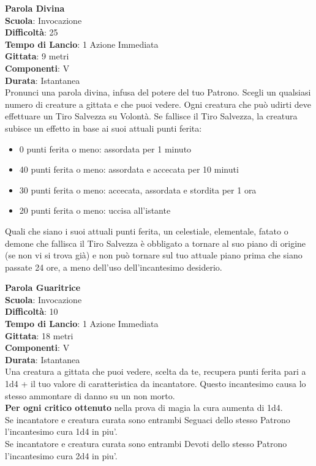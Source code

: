 \begin{multicols}{2}
\medskip\textbf{Parola Divina}\\
\textbf{Scuola}: Invocazione\\
\textbf{Difficoltà}: 25\\
\textbf{Tempo di Lancio}: 1 Azione Immediata\\
\textbf{Gittata}: 9 metri\\
\textbf{Componenti}: V\\
\textbf{Durata}: Istantanea\\
Pronunci una parola divina, infusa del potere del tuo Patrono. Scegli un qualsiasi numero di creature a gittata e che puoi vedere. Ogni creatura che può udirti deve effettuare un Tiro Salvezza su Volontà. Se fallisce il Tiro Salvezza, la creatura subisce un effetto in base ai suoi attuali punti ferita:
\medskip
\begin{itemize}
\item	
0 punti ferita o meno: assordata per 1 minuto
\item	
40 punti ferita o meno: assordata e accecata per 10 minuti
\item	
30 punti ferita o meno: accecata, assordata e stordita per 1 ora
\item	
20 punti ferita o meno: uccisa all'istante
\end{itemize}
\medskip
Quali che siano i suoi attuali punti ferita, un celestiale, elementale, fatato o demone che fallisca il Tiro Salvezza è obbligato a tornare al suo piano di origine (se non vi si trova già) e non può tornare sul tuo attuale piano prima che siano passate 24 ore, a meno dell'uso dell'incantesimo desiderio.

\medskip\textbf{Parola Guaritrice}\\
\textbf{Scuola}: Invocazione\\
\textbf{Difficoltà}: 10\\
\textbf{Tempo di Lancio}: 1 Azione Immediata\\
\textbf{Gittata}: 18 metri\\
\textbf{Componenti}: V\\
\textbf{Durata}: Istantanea\\
Una creatura a gittata che puoi vedere, scelta da te, recupera punti ferita pari a 1d4 + il tuo valore di caratteristica da incantatore. Questo incantesimo causa lo stesso ammontare di danno su un non morto.\\
\textbf{Per ogni critico ottenuto} nella prova di magia la cura aumenta di 1d4.\\
Se incantatore e creatura curata sono entrambi Seguaci dello stesso Patrono l'incantesimo cura 1d4 in piu'.\\
Se incantatore e creatura curata sono entrambi Devoti dello stesso Patrono l'incantesimo cura 2d4 in piu'.\\


\end{multicols}
